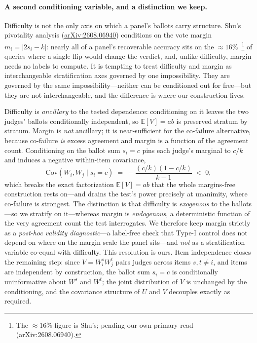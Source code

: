 \documentclass[11pt,a4paper]{article}
\begin{document}
\paragraph{A second conditioning variable, and a distinction we keep.}
Difficulty is not the only axis on which a panel's ballots carry structure.  Shu's pivotality
analysis (\href{https://arxiv.org/abs/2608.06940}{arXiv:2608.06940}) conditions on the vote
margin $m_i = |2s_i - k|$: nearly all of a panel's recoverable accuracy sits on the $\approx
16\%$~\footnote{The $\approx 16\%$ figure is Shu's; pending our own primary read (arXiv:2608.06940).} of queries where a single flip would change the verdict, and, unlike difficulty, margin
needs no labels to compute.  It is tempting to treat difficulty and margin as interchangeable
stratification axes governed by one impossibility.  They are governed by the same
impossibility---neither can be conditioned out for free---but they are not interchangeable, and
the difference is where our construction lives.

Difficulty is \emph{ancillary} to the tested dependence: conditioning on it leaves the two
judges' ballots conditionally independent, so $\mathbb{E}[V] = ab$ is preserved stratum by
stratum.  Margin is \emph{not} ancillary; it is near-sufficient for the co-failure alternative,
because co-failure \emph{is} excess agreement and margin is a function of the agreement count.
Conditioning on the ballot sum $s_i = c$ pins each judge's marginal to $c/k$ and induces a
negative within-item covariance,
\[
  \mathrm{Cov}(W_i, W_j \mid s_i = c)
  \;=\; -\frac{(c/k)(1 - c/k)}{k-1} \;<\; 0,
\]
which breaks the exact factorization $\mathbb{E}[V] = ab$ that the whole margins-free
construction rests on---and drains the test's power precisely at unanimity, where co-failure
is strongest.  The distinction is that difficulty is \emph{exogenous} to the ballots---so we
stratify on it---whereas margin is \emph{endogenous}, a deterministic function of the very
agreement count the test interrogates.  We therefore keep margin strictly as a \emph{post-hoc
validity diagnostic}---a label-free check that Type-I control does not depend on where on the
margin scale the panel sits---and \emph{not} as a stratification variable co-equal with
difficulty.  This resolution is ours.  Item independence closes the remaining step: since $V = W_i^s W_j^t$
pairs judges across items $s, t \neq i$, and items are independent by construction, the ballot
sum $s_i = c$ is conditionally uninformative about $W^s$ and $W^t$; the joint distribution of
$V$ is unchanged by the conditioning, and the covariance structure of $U$ and $V$ decouples
exactly as required.
\end{document}
